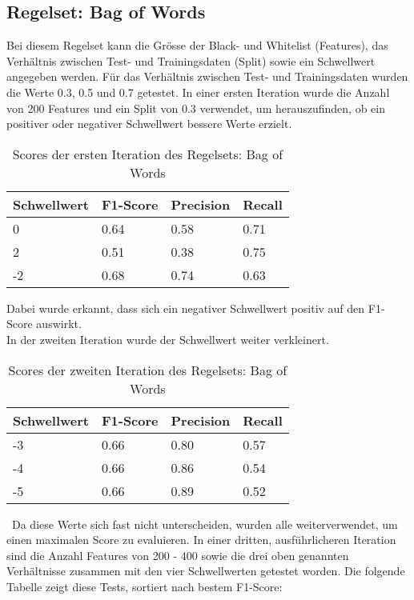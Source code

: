 \subsection{Regelset: Bag of Words}
Bei diesem Regelset kann die Grösse der Black- und Whitelist (Features), das Verhältnis zwischen Test- und Trainingsdaten (Split) sowie ein Schwellwert angegeben werden.
Für das Verhältnis zwischen Test- und Trainingsdaten wurden die Werte 0.3, 0.5 und 0.7 getestet.
In einer ersten Iteration wurde die Anzahl von 200 Features und ein Split von 0.3 verwendet, um herauszufinden, ob ein positiver oder negativer Schwellwert bessere Werte erzielt.\\
\begin{table}[H]
	\caption{Scores der ersten Iteration des Regelsets: Bag of Words}
	\centering
\begin{tabular}{|l|l|l|l|}
	\hline
	Schwellwert & F1-Score & Precision & Recall\\
	\hline
	0 & 0.64 & 0.58 & 0.71 \\
	2 & 0.51 & 0.38 & 0.75 \\
	-2 & 0.68 & 0.74 & 0.63 \\
	\hline
\end{tabular}
\end{table}
Dabei wurde erkannt, dass sich ein negativer Schwellwert positiv auf den F1-Score auswirkt.\\
In der zweiten Iteration wurde der Schwellwert weiter verkleinert.\\
\begin{table}[H]
	\caption{Scores der zweiten Iteration des Regelsets: Bag of Words}
	\centering
\begin{tabular}{|l|l|l|l|}
	\hline
	Schwellwert & F1-Score & Precision & Recall\\
	\hline
	-3 & 0.66 & 0.80 & 0.57 \\
	-4 & 0.66 & 0.86 & 0.54 \\
	-5 & 0.66 & 0.89 & 0.52 \\
	\hline
\end{tabular}
\end{table}\
Da diese Werte sich fast nicht unterscheiden, wurden alle weiterverwendet, um einen maximalen Score zu evaluieren.
In einer dritten, ausführlicheren Iteration sind die Anzahl Features von 200 - 400 sowie die drei oben genannten Verhältnisse zusammen mit den vier Schwellwerten getestet worden. Die folgende Tabelle zeigt diese Tests, sortiert nach bestem F1-Score:\\
